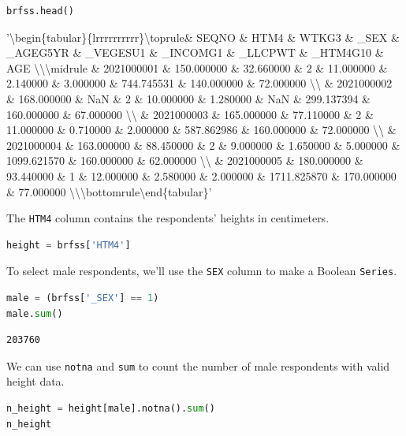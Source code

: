 \begin{lstlisting}[language=Python,style=source]
brfss.head()
\end{lstlisting}

'\textbackslash begin\{tabular\}\{lrrrrrrrrrr\}\n\textbackslash toprule\n \&
SEQNO \& HTM4 \& WTKG3 \& \_SEX \& \_AGEG5YR \& \_VEGESU1 \& \_INCOMG1
\& \_LLCPWT \& \_HTM4G10 \& AGE
\textbackslash\textbackslash{}\n\textbackslash midrule \& 2021000001
\& 150.000000 \& 32.660000 \& 2 \& 11.000000 \& 2.140000 \& 3.000000 \&
744.745531 \& 140.000000 \& 72.000000 \textbackslash\textbackslash{}
\& 2021000002 \& 168.000000 \& NaN \& 2 \& 10.000000 \& 1.280000 \& NaN
\& 299.137394 \& 160.000000 \& 67.000000
\textbackslash\textbackslash{} \& 2021000003 \& 165.000000 \&
77.110000 \& 2 \& 11.000000 \& 0.710000 \& 2.000000 \& 587.862986 \&
160.000000 \& 72.000000 \textbackslash\textbackslash{} \& 2021000004
\& 163.000000 \& 88.450000 \& 2 \& 9.000000 \& 1.650000 \& 5.000000 \&
1099.621570 \& 160.000000 \& 62.000000 \textbackslash\textbackslash{}
\& 2021000005 \& 180.000000 \& 93.440000 \& 1 \& 12.000000 \& 2.580000
\& 2.000000 \& 1711.825870 \& 170.000000 \& 77.000000
\textbackslash\textbackslash{}\n\textbackslash bottomrule\n\textbackslash end\{tabular\}\n'

The \passthrough{\lstinline!HTM4!} column contains the respondents'
heights in centimeters.

\begin{lstlisting}[language=Python,style=source]
height = brfss['HTM4']
\end{lstlisting}

To select male respondents, we'll use the \passthrough{\lstinline!SEX!}
column to make a Boolean \passthrough{\lstinline!Series!}.

\begin{lstlisting}[language=Python,style=source]
male = (brfss['_SEX'] == 1)
male.sum()
\end{lstlisting}

\begin{lstlisting}[style=output]
203760
\end{lstlisting}

We can use \passthrough{\lstinline!notna!} and
\passthrough{\lstinline!sum!} to count the number of male respondents
with valid height data.

\begin{lstlisting}[language=Python,style=source]
n_height = height[male].notna().sum()
n_height
\end{lstlisting}

